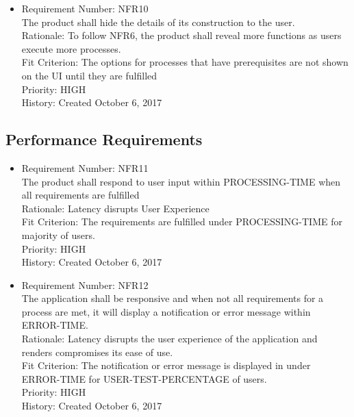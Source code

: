 \documentclass[12pt, titlepage]{article}
\begin{document}
\begin{itemize}
	\item Requirement Number: NFR10\\
The product shall hide the details of its construction to the user.\\
Rationale: To follow NFR6, the product shall reveal more functions as users execute more processes.\\
Fit Criterion: The options for processes that have prerequisites are not shown on the UI until they are fulfilled\\
Priority: HIGH\\
History: Created October 6, 2017
		
\end{itemize}

\subsection{Performance Requirements}
\begin{itemize}
	\item Requirement Number: NFR11\\
The product shall respond to user input within PROCESSING-TIME when all requirements are fulfilled\\
Rationale:  Latency disrupts User Experience\\
Fit Criterion: The requirements are fulfilled under PROCESSING-TIME for majority of users.\\
Priority: HIGH\\
History: Created October 6, 2017

	\item Requirement Number: NFR12\\
The application shall be responsive and when not all requirements for a process are met,  it will display a notification or error message within ERROR-TIME.  \\
Rationale: Latency disrupts the user experience of the application and renders compromises its ease of use.  \\
Fit Criterion: The notification or error message is displayed in under ERROR-TIME for USER-TEST-PERCENTAGE of users.  \\
Priority: HIGH\\
History: Created October 6, 2017

\end{itemize}
\end{document}
